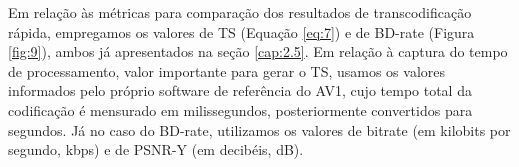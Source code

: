 Em relação às métricas para comparação dos resultados de transcodificação rápida, empregamos os valores de TS (Equação \ref{eq:7}) e de BD-rate (Figura \ref{fig:9}), ambos já apresentados na seção \ref{cap:2.5}. Em relação à captura do tempo de processamento, valor importante para gerar o TS, usamos os valores informados pelo próprio software de referência do AV1, cujo tempo total da codificação é mensurado em milissegundos, posteriormente convertidos para segundos. Já no caso do BD-rate, utilizamos os valores de bitrate (em kilobits por segundo, kbps) e de PSNR-Y (em decibéis, dB).
